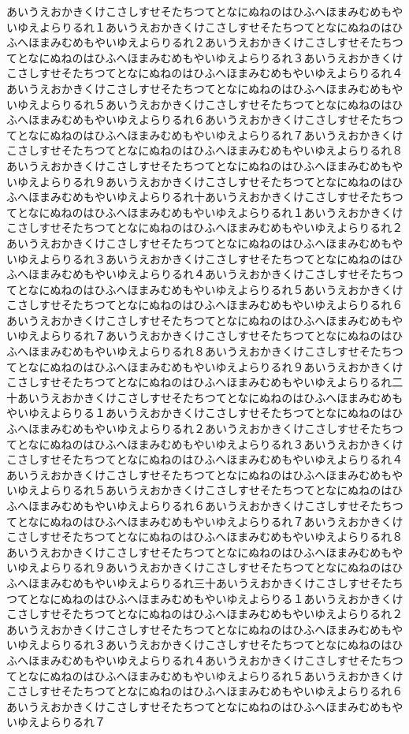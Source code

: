 \documentclass[uplatex,dvipdfmx,11pt]{jsbook}
\begin{document}
      あいうえおかきくけこさしすせそたちつてとなにぬねのはひふへほまみむめもやいゆえよらりるれ１あいうえおかきくけこさしすせそたちつてとなにぬねのはひふへほまみむめもやいゆえよらりるれ２あいうえおかきくけこさしすせそたちつてとなにぬねのはひふへほまみむめもやいゆえよらりるれ３あいうえおかきくけこさしすせそたちつてとなにぬねのはひふへほまみむめもやいゆえよらりるれ４あいうえおかきくけこさしすせそたちつてとなにぬねのはひふへほまみむめもやいゆえよらりるれ５あいうえおかきくけこさしすせそたちつてとなにぬねのはひふへほまみむめもやいゆえよらりるれ６あいうえおかきくけこさしすせそたちつてとなにぬねのはひふへほまみむめもやいゆえよらりるれ７あいうえおかきくけこさしすせそたちつてとなにぬねのはひふへほまみむめもやいゆえよらりるれ８あいうえおかきくけこさしすせそたちつてとなにぬねのはひふへほまみむめもやいゆえよらりるれ９あいうえおかきくけこさしすせそたちつてとなにぬねのはひふへほまみむめもやいゆえよらりるれ十あいうえおかきくけこさしすせそたちつてとなにぬねのはひふへほまみむめもやいゆえよらりるれ１あいうえおかきくけこさしすせそたちつてとなにぬねのはひふへほまみむめもやいゆえよらりるれ２あいうえおかきくけこさしすせそたちつてとなにぬねのはひふへほまみむめもやいゆえよらりるれ３あいうえおかきくけこさしすせそたちつてとなにぬねのはひふへほまみむめもやいゆえよらりるれ４あいうえおかきくけこさしすせそたちつてとなにぬねのはひふへほまみむめもやいゆえよらりるれ５あいうえおかきくけこさしすせそたちつてとなにぬねのはひふへほまみむめもやいゆえよらりるれ６あいうえおかきくけこさしすせそたちつてとなにぬねのはひふへほまみむめもやいゆえよらりるれ７あいうえおかきくけこさしすせそたちつてとなにぬねのはひふへほまみむめもやいゆえよらりるれ８あいうえおかきくけこさしすせそたちつてとなにぬねのはひふへほまみむめもやいゆえよらりるれ９あいうえおかきくけこさしすせそたちつてとなにぬねのはひふへほまみむめもやいゆえよらりるれ二十あいうえおかきくけこさしすせそたちつてとなにぬねのはひふへほまみむめもやいゆえよらりる１あいうえおかきくけこさしすせそたちつてとなにぬねのはひふへほまみむめもやいゆえよらりるれ２あいうえおかきくけこさしすせそたちつてとなにぬねのはひふへほまみむめもやいゆえよらりるれ３あいうえおかきくけこさしすせそたちつてとなにぬねのはひふへほまみむめもやいゆえよらりるれ４あいうえおかきくけこさしすせそたちつてとなにぬねのはひふへほまみむめもやいゆえよらりるれ５あいうえおかきくけこさしすせそたちつてとなにぬねのはひふへほまみむめもやいゆえよらりるれ６あいうえおかきくけこさしすせそたちつてとなにぬねのはひふへほまみむめもやいゆえよらりるれ７あいうえおかきくけこさしすせそたちつてとなにぬねのはひふへほまみむめもやいゆえよらりるれ８あいうえおかきくけこさしすせそたちつてとなにぬねのはひふへほまみむめもやいゆえよらりるれ９あいうえおかきくけこさしすせそたちつてとなにぬねのはひふへほまみむめもやいゆえよらりるれ三十あいうえおかきくけこさしすせそたちつてとなにぬねのはひふへほまみむめもやいゆえよらりる１あいうえおかきくけこさしすせそたちつてとなにぬねのはひふへほまみむめもやいゆえよらりるれ２あいうえおかきくけこさしすせそたちつてとなにぬねのはひふへほまみむめもやいゆえよらりるれ３あいうえおかきくけこさしすせそたちつてとなにぬねのはひふへほまみむめもやいゆえよらりるれ４あいうえおかきくけこさしすせそたちつてとなにぬねのはひふへほまみむめもやいゆえよらりるれ５あいうえおかきくけこさしすせそたちつてとなにぬねのはひふへほまみむめもやいゆえよらりるれ６あいうえおかきくけこさしすせそたちつてとなにぬねのはひふへほまみむめもやいゆえよらりるれ７
\end{document}
